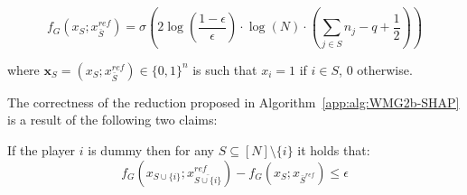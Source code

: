 $$f_{G}(x_{S};x_{\bar{S}}^{ref}) = \sigma \left(2 \log(\frac{1 - \epsilon}{\epsilon})\cdot \log(N) \cdot (\sum\limits_{j \in S} n_{j} - q + \frac{1}{2})\right)$$

where $\mathbf{x}_{S} = (x_{S}; x_{\bar{S}}^{ref}) \in \{0,1\}^{n}$ is such that $x_{i} = 1$ if $i \in S$, $0$ otherwise.

The correctness of the reduction proposed in  Algorithm~\ref{app:alg:WMG2b-SHAP} is a result of the following two claims:

\begin{claim} \label{app:claim:one} 
If the player $i$ is dummy then for any $S \subseteq [N] \setminus \{i\}$ it holds that: 
    \begin{equation} \label{app:eq:claim1}
    f_{G}(x_{S \cup \{i\}};x_{\bar{S \cup \{i\}}}^{ref}) - f_{G}(x_{S}; x_{\bar{S}^{ref}}) \leq \epsilon
    \end{equation}
    \end{claim}

